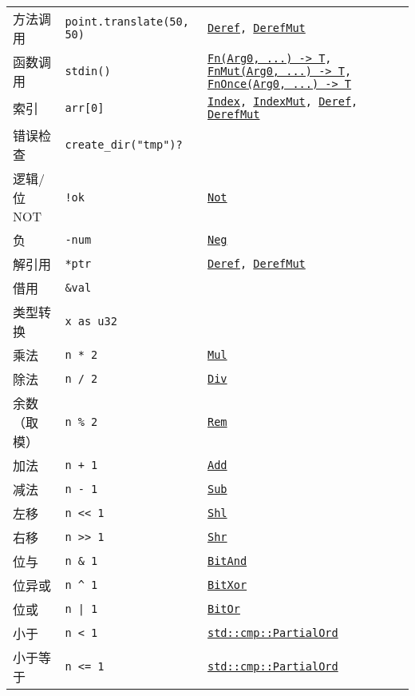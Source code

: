 \begin{longtable}{p{}p{}p{}}
    方法调用       & \texttt{point.translate(50, 50)} & \texttt{\hyperref[deref]{Deref}, \hyperref[deref]{DerefMut}} \\
    函数调用       & \texttt{stdin()}   & \texttt{\hyperref[fn]{Fn(Arg0, ...) -> T}, \hyperref[fn]{FnMut(Arg0, ...) -> T}, \hyperref[fn]{FnOnce(Arg0, ...) -> T}} \\
    索引            & \texttt{arr[0]}   & \texttt{\hyperref[index]{Index}, \hyperref[index]{IndexMut}, \hyperref[deref]{Deref}, \hyperref[deref]{DerefMut}} \\
    \cline{1-2}
    错误检查        & \texttt{create\_dir("tmp")?}   & \\
    \cline{1-2}
    逻辑/位 NOT     & \texttt{!ok}  & \texttt{\hyperref[unop]{Not}} \\
    负             & \texttt{-num}  & \texttt{\hyperref[unop]{Neg}} \\
    解引用          & \texttt{*ptr} & \texttt{\hyperref[deref]{Deref}, \hyperref[deref]{DerefMut}} \\
    借用            & \texttt{\&val}    & \\
    \cline{1-2}
    类型转换    & \texttt{x as u32} & \\
    \cline{1-2}
    乘法        & \texttt{n * 2}    & \texttt{\hyperref[biop]{Mul}} \\
    除法        & \texttt{n / 2}    & \texttt{\hyperref[biop]{Div}} \\
    余数（取模） & \texttt{n \% 2}   & \texttt{\hyperref[biop]{Rem}} \\
    \hline
    加法        & \texttt{n + 1}    & \texttt{\hyperref[biop]{Add}} \\
    减法        & \texttt{n - 1}    & \texttt{\hyperref[biop]{Sub}} \\
    \hline
    左移        & \texttt{n << 1}   & \texttt{\hyperref[biop]{Shl}} \\
    右移        & \texttt{n >> 1}   & \texttt{\hyperref[biop]{Shr}} \\
    \hline
    位与        & \texttt{n \& 1}   & \texttt{\hyperref[biop]{BitAnd}} \\
    \hline
    位异或      & \texttt{n \^{} 1} & \texttt{\hyperref[biop]{BitXor}} \\
    \hline
    位或        & \texttt{n | 1}    & \texttt{\hyperref[biop]{BitOr}}  \\
    \hline
    小于        & \texttt{n < 1}    & \texttt{\hyperref[cmp]{std::cmp::PartialOrd}} \\
    小于等于    & \texttt{n <= 1}   & \texttt{\hyperref[cmp]{std::cmp::PartialOrd}} \\

\end{longtable}

